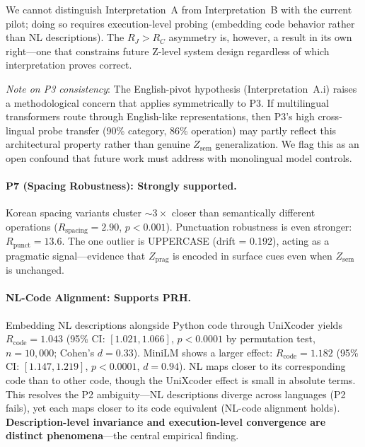 \documentclass[11pt]{article}
\theoremstyle{definition}
\newcommand{\Zsem}{Z_{\text{sem}}}
\newcommand{\Zprag}{Z_{\text{prag}}}
\begin{document}
We cannot distinguish Interpretation~A from Interpretation~B with the current pilot; doing so requires execution-level probing (embedding code behavior rather than NL descriptions). The $R_J > R_C$ asymmetry is, however, a result in its own right---one that constrains future Z-level system design regardless of which interpretation proves correct.

\emph{Note on P3 consistency}: The English-pivot hypothesis (Interpretation~A.i) raises a methodological concern that applies symmetrically to P3. If multilingual transformers route through English-like representations, then P3's high cross-lingual probe transfer (90\% category, 86\% operation) may partly reflect this architectural property rather than genuine $\Zsem$ generalization. We flag this as an open confound that future work must address with monolingual model controls.

\paragraph{P7 (Spacing Robustness): Strongly supported.}
Korean spacing variants cluster ${\sim}3\times$ closer than semantically different operations ($R_{\text{spacing}} = 2.90$, $p < 0.001$). Punctuation robustness is even stronger: $R_{\text{punct}} = 13.6$. The one outlier is UPPERCASE (drift = 0.192), acting as a pragmatic signal---evidence that $\Zprag$ is encoded in surface cues even when $\Zsem$ is unchanged.

\paragraph{NL-Code Alignment: Supports PRH.}
Embedding NL descriptions alongside Python code through UniXcoder yields $R_{\text{code}} = 1.043$ (95\% CI: $[1.021, 1.066]$, $p < 0.0001$ by permutation test, $n = 10{,}000$; Cohen's $d = 0.33$). MiniLM shows a larger effect: $R_{\text{code}} = 1.182$ (95\% CI: $[1.147, 1.219]$, $p < 0.0001$, $d = 0.94$). NL maps closer to its corresponding code than to other code, though the UniXcoder effect is small in absolute terms. This resolves the P2 ambiguity---NL descriptions diverge across languages (P2 fails), yet each maps closer to its code equivalent (NL-code alignment holds). \textbf{Description-level invariance and execution-level convergence are distinct phenomena}---the central empirical finding.
\end{document}
